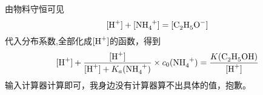 \documentclass[12pt,AutoFakeBold]{article}%
\begin{document}

    
    由物料守恒可见
    \[[\ce{H+}]+[\ce{NH4+}]=[\ce{C2H5O-}]\]
    代入分布系数,全部化成$[\ce{H+}]$的函数，得到
    \[[\ce{H+}]+\frac{[\ce{H+}]}{[\ce{H+}]+K_a(\ce{NH4+})}\times c_0(\ce{NH4+})=\frac{K(\ce{C2H5OH})}{[\ce{H+}]}\]
    输入计算器计算即可，我身边没有计算器算不出具体的值，抱歉。
        
\end{document}
